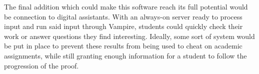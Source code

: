 The final addition which could make this software reach its full potential would be connection to digital assistants. With an always-on server ready to process input and run said input through Vampire, students could quickly check their work or answer questions they find interesting. Ideally, some sort of system would be put in place to prevent these results from being used to cheat on academic assignments, while still granting enough information for a student to follow the progression of the proof.
